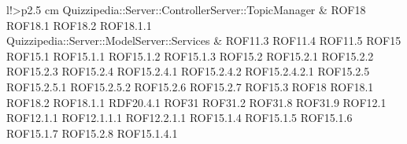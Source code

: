 \begin{tabella}{l!{\VRule}>{\centering\arraybackslash}p{2.5 cm}}
Quizzipedia::Server::ControllerServer::TopicManager & ROF18 \linebreak ROF18.1 \linebreak ROF18.2 \linebreak ROF18.1.1 \\
Quizzipedia::Server::ModelServer::Services & ROF11.3 \linebreak ROF11.4 \linebreak ROF11.5 \linebreak ROF15 \linebreak ROF15.1 \linebreak ROF15.1.1 \linebreak ROF15.1.2 \linebreak ROF15.1.3 \linebreak ROF15.2 \linebreak ROF15.2.1 \linebreak ROF15.2.2 \linebreak ROF15.2.3 \linebreak ROF15.2.4 \linebreak ROF15.2.4.1 \linebreak ROF15.2.4.2 \linebreak ROF15.2.4.2.1 \linebreak ROF15.2.5 \linebreak ROF15.2.5.1 \linebreak ROF15.2.5.2 \linebreak ROF15.2.6 \linebreak ROF15.2.7 \linebreak ROF15.3 \linebreak ROF18 \linebreak ROF18.1 \linebreak ROF18.2 \linebreak ROF18.1.1 \linebreak RDF20.4.1 \linebreak ROF31 \linebreak ROF31.2 \linebreak ROF31.8 \linebreak ROF31.9 \linebreak ROF12.1 \linebreak ROF12.1.1 \linebreak ROF12.1.1.1 \linebreak ROF12.2.1.1 \linebreak ROF15.1.4 \linebreak ROF15.1.5 \linebreak ROF15.1.6 \linebreak ROF15.1.7 \linebreak ROF15.2.8 \linebreak ROF15.1.4.1 \\

\end{tabella}
